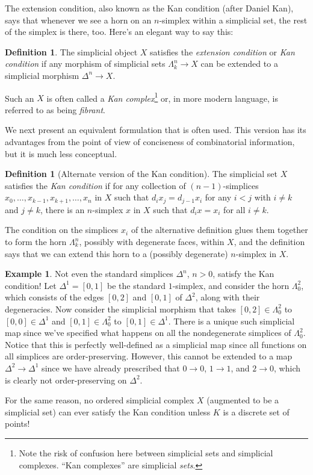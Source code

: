 \documentclass[12pt]{article}
\theoremstyle{plain}
\theoremstyle{definition}
\newtheorem{definition}[theorem]{Definition}
\newtheorem{example}[theorem]{Example}
\begin{document}
The extension condition, also known as the Kan condition (after Daniel Kan), says that whenever we see a horn on an $n$-simplex within a simplicial set, the rest of the simplex is there, too. Here's an elegant way to say this:

\begin{definition}
The simplicial object $X$  satisfies the \emph{extension condition} or \emph{Kan condition} if any morphism of simplicial sets $\Lambda^n_k\to X$ can be extended to a simplicial morphism $\Delta^n\to X$.

Such an $X$ is often called a \emph{Kan complex}\footnote{Note the risk of confusion here between simplicial sets and simplicial complexes. ``Kan complexes'' are simplicial \emph{sets}.} or, in more modern language, is referred to as being \emph{fibrant}.  
\end{definition}

We next present an equivalent formulation that is often used. This version has its advantages from the point of view of conciseness of combinatorial information, but it is much less conceptual.

\begin{definition}[Alternate version of the Kan condition]
The simplicial set $X$ satisfies the  \emph{Kan condition} if for any collection of $(n-1)$-simplices $x_0,\ldots, x_{k-1}, x_{k+1}, \ldots, x_{n}$ in $X$ such that $d_ix_j=d_{j-1}x_i$ for any $i<j$ with $i\neq k$ and $j\neq k$, there is an $n$-simplex $x$ in $X$ such that $d_ix=x_i$ for all $i\neq k$. 
\end{definition}

The condition on the simplices $x_i$ of the alternative definition glues them together to form the horn $\Lambda_k^n$, possibly with degenerate faces, within $X$, and the definition says that we can extend this horn to a (possibly degenerate) $n$-simplex in $X$.



\begin{example}\label{E: not Kan}
Not even the standard simplices $\Delta^n$, $n>0$, satisfy the Kan condition! Let $\Delta^1=[0,1]$ be the standard $1$-simplex, and consider the horn $\Lambda^2_0$, which consists of the edges $[0,2]$ and $[0,1]$ of $\Delta^2$, along with their degeneracies. Now consider the simplicial morphism that takes $[0,2]\in\Lambda^2_0$ to $[0,0]\in \Delta^1$ and $[0,1]\in\Lambda^2_0$ to $[0,1]\in\Delta^1$. There is a unique such simplicial map since we've specified what happens on all the nondegenerate simplices of $\Lambda^2_0$.  Notice that this is perfectly well-defined as a simplicial map since all functions on all simplices are order-preserving. However, this cannot be extended to a map $\Delta^2\to \Delta^1$ since we have already prescribed that $0\to 0$, $1\to 1$, and $2\to 0$, which is clearly not order-preserving on $\Delta^2$. 

For the same reason, no ordered simplicial complex $X$ (augmented to be a simplicial set) can ever satisfy the Kan condition unless $K$ is a discrete set of points! 
\end{example}
\end{document}
